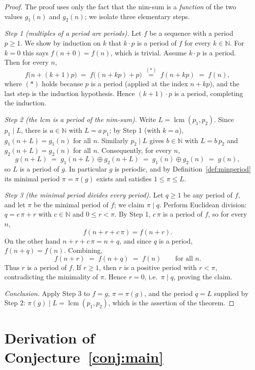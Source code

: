 \documentclass[11pt]{article}
\theoremstyle{definition}
\theoremstyle{remark}
\begin{document}
\begin{proof}
The proof uses only the fact that the nim-sum is a \emph{function} of the two values $g_1(n)$ and $g_2(n)$; we isolate three elementary steps.

\emph{Step 1 (multiples of a period are periods).} Let $f$ be a sequence with a period $p \ge 1$. We show by induction on $k$ that $k \cdot p$ is a period of $f$ for every $k \in \mathbb{N}$. For $k = 0$ this says $f(n + 0) = f(n)$, which is trivial. Assume $k \cdot p$ is a period. Then for every $n$,
\[
f\bigl(n + (k+1)p\bigr) \;=\; f\bigl((n + k p) + p\bigr) \;\overset{(\ast)}{=}\; f(n + k p) \;=\; f(n),
\]
where $(\ast)$ holds because $p$ is a period (applied at the index $n + kp$), and the last step is the induction hypothesis. Hence $(k+1) \cdot p$ is a period, completing the induction.

\emph{Step 2 (the lcm is a period of the nim-sum).} Write $L = \operatorname{lcm}(p_1, p_2)$. Since $p_1 \mid L$, there is $a \in \mathbb{N}$ with $L = a\,p_1$; by Step 1 (with $k = a$), $g_1(n + L) = g_1(n)$ for all $n$. Similarly $p_2 \mid L$ gives $b \in \mathbb{N}$ with $L = b\,p_2$ and $g_2(n + L) = g_2(n)$ for all $n$. Consequently, for every $n$,
\[
g(n + L) \;=\; g_1(n + L) \oplus g_2(n + L) \;=\; g_1(n) \oplus g_2(n) \;=\; g(n),
\]
so $L$ is a period of $g$. In particular $g$ is periodic, and by Definition~\ref{def:minperiod} its minimal period $\pi = \pi(g)$ exists and satisfies $1 \le \pi \le L$.

\emph{Step 3 (the minimal period divides every period).} Let $q \ge 1$ be any period of $f$, and let $\pi$ be the minimal period of $f$; we claim $\pi \mid q$. Perform Euclidean division: $q = c\,\pi + r$ with $c \in \mathbb{N}$ and $0 \le r < \pi$. By Step 1, $c\,\pi$ is a period of $f$, so for every $n$,
\[
f(n + r + c\,\pi) = f(n + r).
\]
On the other hand $n + r + c\,\pi = n + q$, and since $q$ is a period, $f(n + q) = f(n)$. Combining,
\[
f(n + r) \;=\; f(n + q) \;=\; f(n) \qquad \text{for all } n.
\]
Thus $r$ is a period of $f$. If $r \ge 1$, then $r$ is a positive period with $r < \pi$, contradicting the minimality of $\pi$. Hence $r = 0$, i.e.\ $\pi \mid q$, proving the claim.

\emph{Conclusion.} Apply Step 3 to $f = g$, $\pi = \pi(g)$, and the period $q = L$ supplied by Step 2: $\pi(g) \mid L = \operatorname{lcm}(p_1, p_2)$, which is the assertion of the theorem.
\end{proof}

\section{Derivation of Conjecture~\ref{conj:main}}
\end{document}
